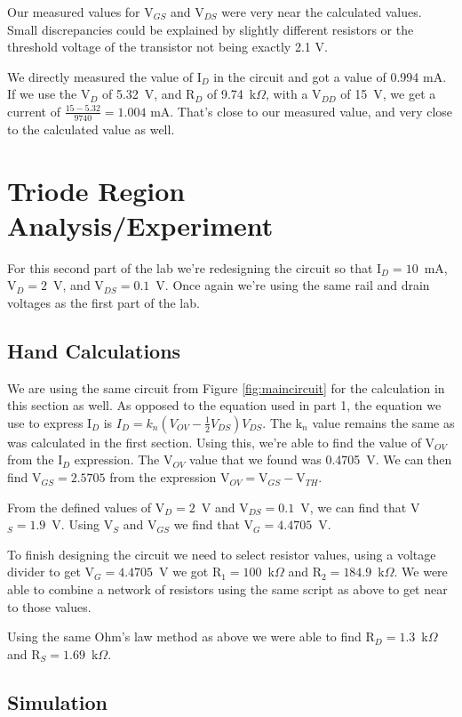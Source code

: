 \documentclass{article}
\begin{document}
Our measured values for V$_{GS}$ and V$_{DS}$ were very near
the calculated values. Small discrepancies could be explained by 
slightly different resistors or the threshold voltage of the 
transistor not being exactly 2.1 V.

We directly measured the value of I$_D$ in the circuit and 
got a value of 0.994 mA. If we use the V$_D$ of 5.32~V, and 
R$_D$ of 9.74~k$\Omega$, with a V$_{DD}$ of 15~V, we get a
current of $\frac{15-5.32}{9740}=1.004$ mA. That's close to 
our measured value, and very close to the calculated value as
well.

\section{Triode Region Analysis/Experiment}

For this second part of the lab we're redesigning the circuit
so that I$_D=10$~mA, V$_D=2$~V, and V$_{DS}=0.1$~V. Once again
we're using the same rail and drain voltages as the first part
of the lab.

\subsection{Hand Calculations}
We are using the same circuit from Figure \ref{fig:maincircuit}
for the calculation in this section as well. As opposed to the
equation used in part 1, the equation we use to express I$_D$ 
is $I_D=k_n(V_{OV}-\frac{1}{2}V_{DS})V_{DS}$.
The k$_n$ value remains the same as was calculated in the 
first section. Using this, we're able to find the value of
V$_{OV}$ from the I$_D$ expression. The V$_{OV}$ value that
we found was 0.4705~V. We can then find V$_{GS}=2.5705$ from 
the expression V$_{OV}=$V$_{GS}-$V$_{TH}$.

From the defined values of V$_D=2$~V and V$_{DS}=0.1$~V, we
can find that V$_S=1.9$~V. Using V$_S$ and V$_{GS}$ we find
that V$_G=4.4705$~V.

To finish designing the circuit we need to select resistor
values, using a voltage divider to get V$_G=4.4705$~V we got
R$_1=100$~k$\Omega$ and R$_2=184.9$~k$\Omega$. We were able
to combine a network of resistors using the same script 
as above to get near to those values. 

Using the same Ohm's law method as above we were able
to find R$_D=1.3$~k$\Omega$ and R$_S=1.69$~k$\Omega$.

\subsection{Simulation}
\end{document}
